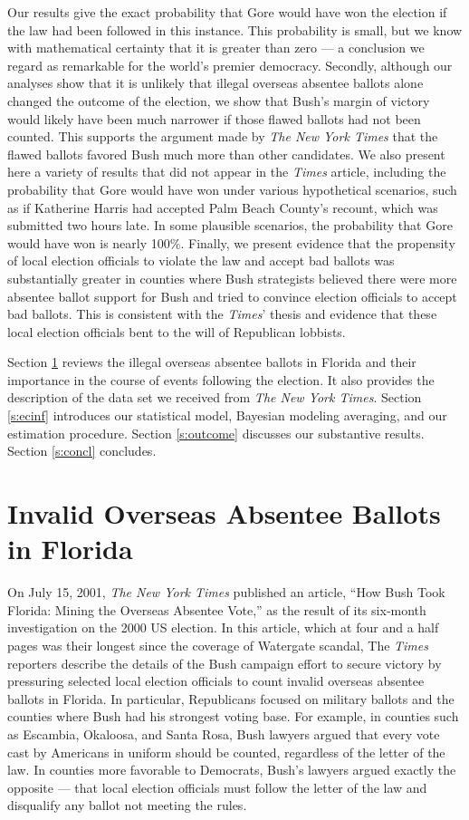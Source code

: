 \documentclass[11pt,titlepage]{article}
\begin{document}
Our results give the exact probability that Gore would have won the
election if the law had been followed in this instance.  This
probability is small, but we know with mathematical certainty that it
is greater than zero --- a conclusion we regard as remarkable for the
world's premier democracy.  Secondly, although our analyses show that
it is unlikely that illegal overseas absentee ballots alone changed
the outcome of the election, we show that Bush's margin of victory
would likely have been much narrower if those flawed ballots had not
been counted.  This supports the argument made by \textit{The New York
  Times} that the flawed ballots favored Bush much more than other
candidates.  We also present here a variety of results that did not
appear in the \emph{Times} article, including the probability that
Gore would have won under various hypothetical scenarios, such as if
Katherine Harris had accepted Palm Beach County's recount, which was
submitted two hours late.  In some plausible scenarios, the
probability that Gore would have won is nearly 100\%.  Finally, we
present evidence that the propensity of local election officials to
violate the law and accept bad ballots was substantially greater in
counties where Bush strategists believed there were more absentee
ballot support for Bush and tried to convince election officials to
accept bad ballots.  This is consistent with the \emph{Times}' thesis
and evidence that these local election officials bent to the will of
Republican lobbists.

Section \ref{s:ballots} reviews the illegal overseas absentee ballots
in Florida and their importance in the course of events following the
election. It also provides the description of the data set we received
from \textit{The New York Times}.  Section \ref{s:ecinf} introduces
our statistical model, Bayesian modeling averaging, and our estimation
procedure.  Section \ref{s:outcome} discusses our substantive results.
Section \ref{s:concl} concludes.

\section{Invalid Overseas Absentee Ballots in Florida} \label{s:ballots}

On July 15, 2001, \textit{The New York Times} published an article,
``How Bush Took Florida: Mining the Overseas Absentee Vote,'' as the
result of its six-month investigation on the 2000 US election. In this
article, which at four and a half pages was their longest since the
coverage of Watergate scandal, The \emph{Times} reporters describe the
details of the Bush campaign effort to secure victory by pressuring
selected local election officials to count invalid overseas absentee
ballots in Florida.  In particular, Republicans focused on military
ballots and the counties where Bush had his strongest voting base.
For example, in counties such as Escambia, Okaloosa, and Santa Rosa,
Bush lawyers argued that every vote cast by Americans in uniform
should be counted, regardless of the letter of the law.  In counties
more favorable to Democrats, Bush's lawyers argued exactly the
opposite --- that local election officials must follow the letter of
the law and disqualify any ballot not meeting the rules.
\end{document}
